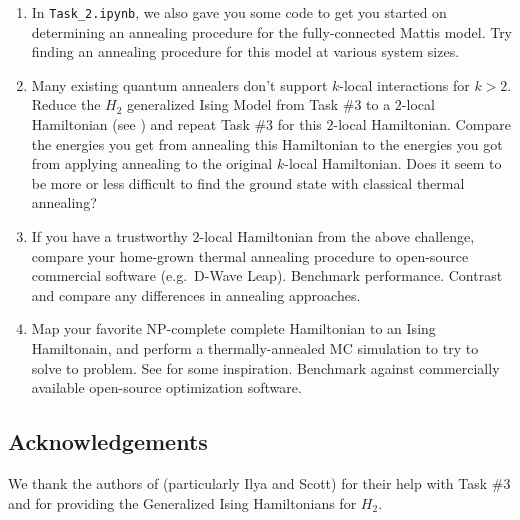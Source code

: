 \documentclass[12pt]{article}
\begin{document}
\begin{enumerate}
    \item In \texttt{Task\_2.ipynb}, we also gave you some code to get you started on determining
          an annealing procedure for the fully-connected Mattis model. Try finding an annealing
          procedure for this model at various system sizes.

    \item Many existing quantum annealers don't support $k$-local interactions for $k > 2$.
          Reduce the $H_2$ generalized Ising Model from Task \#3 to a $2$-local Hamiltonian
          (see \cite{xia2017electronic}) and repeat Task \#3 for this $2$-local Hamiltonian.
          Compare the energies you get from annealing this Hamiltonian to the energies
          you got from applying annealing to the original $k$-local Hamiltonian. Does it seem to
          be more or less difficult to find the ground state with classical thermal annealing?

\item If you have a trustworthy $2$-local Hamiltonian from the above challenge, compare your home-grown 
	thermal annealing procedure to open-source commercial software (e.g.~D-Wave Leap).  Benchmark
	performance.  Contrast and compare any differences in annealing approaches.

    \item Map your favorite NP-complete complete Hamiltonian to an Ising Hamiltonain, and perform
          a thermally-annealed MC simulation to try to solve to problem. See \cite{ising_np} for some
          inspiration. Benchmark against commercially available open-source optimization software.
          
\end{enumerate}

\subsection*{Acknowledgements}\label{sec:acknowledgements}
We thank the authors of \cite{iqcc} (particularly Ilya and Scott) for their help with Task \#3 and for
providing the Generalized Ising Hamiltonians for $H_2$.

\newpage

\nocite{*}


\end{document}
